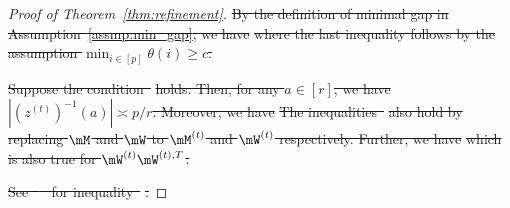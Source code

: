 \documentclass[lettersize,onecolumn,journal]{IEEEtran}
\theoremstyle{definition}
\newtheorem{lem}{Lemma}
\theoremstyle{definition}
\newcommand{\of}[1]{\left(#1\right)}
\newcommand{\offf}[1]{\left\{#1\right\}}
\providecommand{\DIFdeltex}[1]{{\protect\color{red}\sout{#1}}}                      %
\providecommand{\DIFdel}[1]{\texorpdfstring{\DIFdeltex{#1}}{}} %
\begin{document}
\begin{proof}[Proof of Theorem~\ref{thm:refinement}]
\DIFdel{By the definition of minimal gap in Assumption~\ref{assmp:min_gap}, we have 
}%
\DIFdel{where the last inequality follows by the assumption $\min_{i \in [p]} \theta(i) \geq c$.
}%

\DIFdel{Suppose the condition~}%
\DIFdel{holds. Then, for any $a \in [r]$, we have $|\of{z^{(t)}}^{-1}(a)| \asymp p/r$. Moreover, we have 
}%
\DIFdel{The inequalities~}%
\DIFdel{also hold by replacing $\mM$ and $\mW$ to $\mM^{(t)}$ and $\mW^{(t)}$ respectively. 
Further, we have 
}%
\DIFdel{which is also true for $\mW^{(t)}\mW^{(t),T}$.
}%

\DIFdel{See \mbox{%
\citet[Proof of Lemma 4]{han2020exact} }\hspace{0pt}%
for inequality~}%
\DIFdel{.
}%


\end{proof}
\end{document}
